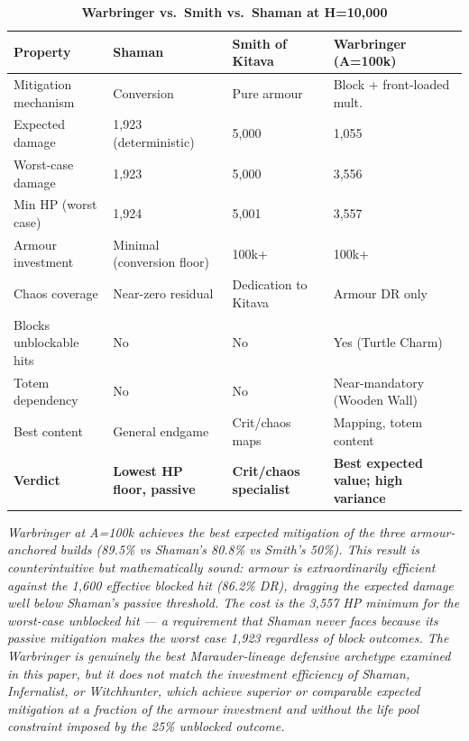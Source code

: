 \documentclass[12pt, letterpaper]{article}
\begin{document}
\begin{table}[htbp]
\centering
\caption{\textbf{Warbringer vs.\ Smith vs.\ Shaman at H=10{,}000}}
{\small
\begin{tabular}{llll}
\toprule
\textbf{Property} & \textbf{Shaman} & \textbf{Smith of Kitava} & \textbf{Warbringer (A=100k)} \\
\midrule
\rowcolor{rowalt} Mitigation mechanism & Conversion & Pure armour & Block + front-loaded mult. \\
Expected damage & 1{,}923 (deterministic) & 5{,}000 & 1{,}055 \\
\rowcolor{rowalt} Worst-case damage & 1{,}923 & 5{,}000 & 3{,}556 \\
Min HP (worst case) & 1{,}924 & 5{,}001 & 3{,}557 \\
\rowcolor{rowalt} Armour investment & Minimal (conversion floor) & 100k+ & 100k+ \\
Chaos coverage & Near-zero residual & Dedication to Kitava & Armour DR only \\
\rowcolor{rowalt} Blocks unblockable hits & No & No & Yes (Turtle Charm) \\
Totem dependency & No & No & Near-mandatory (Wooden Wall) \\
\rowcolor{rowalt} Best content & General endgame & Crit/chaos maps & Mapping, totem content \\
\rowcolor{rowhi} \textbf{Verdict} & \textbf{Lowest HP floor, passive} & \textbf{Crit/chaos specialist} & \textbf{Best expected value; high variance} \\
\bottomrule
\end{tabular}
}
\smallskip
\begin{minipage}{\linewidth}
\small\textit{Warbringer at A=100k achieves the best expected mitigation of the three armour-anchored builds (89.5\% vs Shaman's 80.8\% vs Smith's 50\%). This result is counterintuitive but mathematically sound: armour is extraordinarily efficient against the 1{,}600 effective blocked hit (86.2\% DR), dragging the expected damage well below Shaman's passive threshold. The cost is the 3{,}557 HP minimum for the worst-case unblocked hit --- a requirement that Shaman never faces because its passive mitigation makes the worst case 1{,}923 regardless of block outcomes. The Warbringer is genuinely the best Marauder-lineage defensive archetype examined in this paper, but it does not match the investment efficiency of Shaman, Infernalist, or Witchhunter, which achieve superior or comparable expected mitigation at a fraction of the armour investment and without the life pool constraint imposed by the 25\% unblocked outcome.}
\end{minipage}
\end{table}
\end{document}
